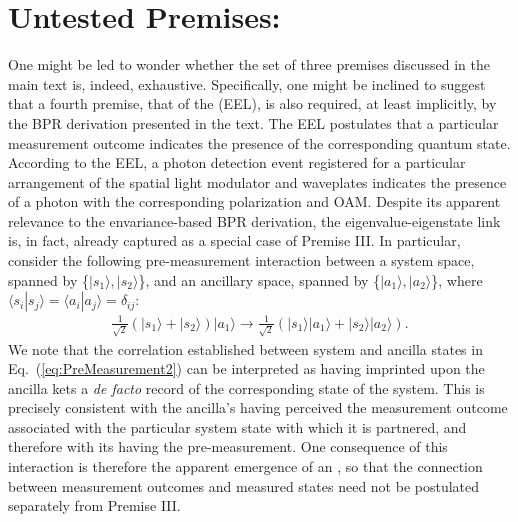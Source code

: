 \documentclass[12pt]{iopart}
\begin{document}
\section{Untested  Premises:}
 One might be led to wonder whether the set of three premises discussed in the main text is, indeed, exhaustive. Specifically, one might be inclined to suggest that a fourth premise, that of the  (EEL), is also required, at least implicitly, by the BPR derivation presented in the text. The EEL postulates that a particular measurement outcome indicates the presence of the corresponding quantum state. According to the EEL, a photon detection event registered for a particular arrangement of the spatial light modulator and waveplates indicates the presence of a photon with the corresponding polarization and OAM. Despite its apparent relevance to the envariance-based BPR derivation, the eigenvalue-eigenstate link is, in fact, already captured as a special case of Premise III. In particular, consider the following pre-measurement interaction between a system space, spanned by \{$|s_1\rangle,|s_2\rangle$\}, and an ancillary space, spanned by \{$|a_1\rangle,|a_2\rangle$\}, where $\langle s_i|s_j\rangle=\langle a_i|a_j\rangle=\delta_{ij}$:
%
\begin{eqnarray}\label{eq:PreMeasurement2}
	\frac{1}{\sqrt{2}}\left(|s_1\rangle + |s_2\rangle\right) |a_1\rangle \rightarrow \frac{1}{\sqrt{2}}\left(|s_1\rangle|a_1\rangle + |s_2\rangle|a_2 \rangle \right).
\end{eqnarray}
%
We note that the correlation established between system and ancilla states in Eq.~(\ref{eq:PreMeasurement2}) can be interpreted as having imprinted upon the ancilla kets a \textit{de facto} record of the corresponding state of the system. This is precisely consistent with the ancilla's having perceived the measurement outcome associated with the particular system state with which it is partnered, and therefore with its having  the pre-measurement. One consequence of this interaction is therefore the apparent emergence of an , so that the connection between measurement outcomes and measured states need not be postulated separately from Premise III. \\
\end{document}
